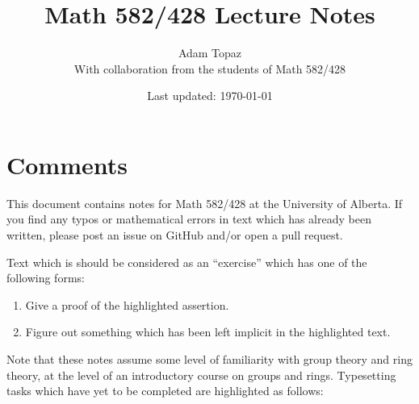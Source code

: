 \documentclass[12pt]{book}
\title{Math 582/428 Lecture Notes}
\date{Last updated: \today}
\author{Adam Topaz \\ With collaboration from the students of Math 582/428}
\begin{document}
\maketitle

\chapter*{Comments}
This document contains notes for Math 582/428 at the University of Alberta.
If you find any typos or mathematical errors in text which has already been written, please post an issue on GitHub and/or open a pull request.

Text which is  should be considered as an ``exercise'' which has one of the following forms:
\begin{enumerate}
\item Give a proof of the highlighted assertion.
\item Figure out something which has been left implicit in the highlighted text.
\end{enumerate}
Note that these notes assume some level of familiarity with group theory and ring theory, at the level of an introductory course on groups and rings.
Typesetting tasks which have yet to be completed are highlighted as follows: 

\tableofcontents


\end{document}
